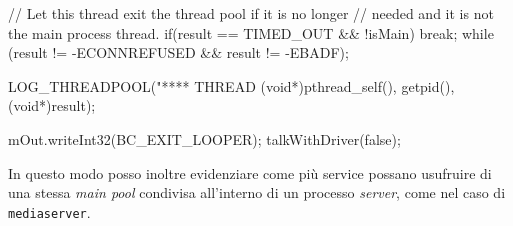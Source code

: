 \begin{cpp}
{{        // Let this thread exit the thread pool if it is no longer
        // needed and it is not the main process thread.
        if(result == TIMED_OUT && !isMain) {
            break;
        }
    } while (result != -ECONNREFUSED && result != -EBADF);

    LOG_THREADPOOL("**** THREAD %
        (void*)pthread_self(), getpid(), (void*)result);
    
    mOut.writeInt32(BC_EXIT_LOOPER);
    talkWithDriver(false);
}
\end{cpp}

In questo modo posso inoltre evidenziare come più service possano usufruire di una
stessa \textit{main pool} condivisa all'interno di un processo \textit{server}, come
nel caso di \texttt{\small mediaserver}.

